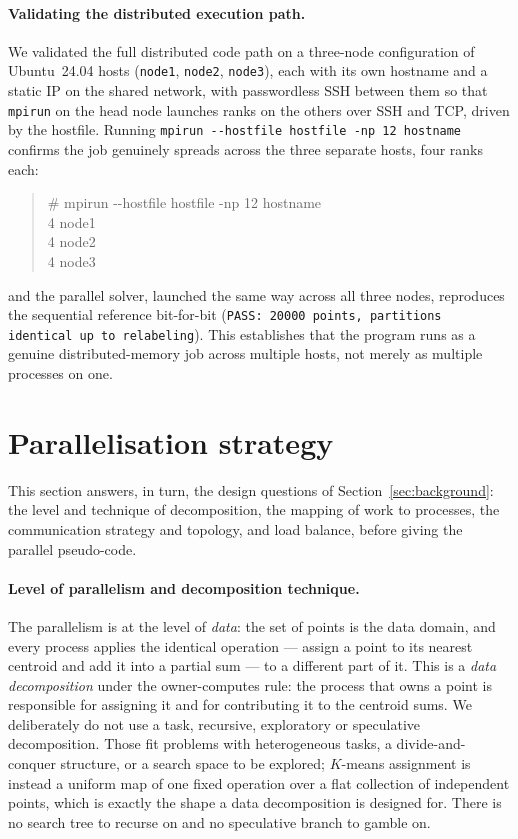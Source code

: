 \documentclass[11pt,a4paper]{article}
\begin{document}
\paragraph{Validating the distributed execution path.}
We validated the full distributed code path on a three-node configuration of
Ubuntu~24.04 hosts (\texttt{node1}, \texttt{node2}, \texttt{node3}), each with
its own hostname and a static IP on the shared network, with passwordless SSH
between them so that \texttt{mpirun} on the head node launches ranks on the
others over SSH and TCP, driven by the hostfile. Running
\texttt{mpirun -{}-hostfile hostfile -np 12 hostname} confirms the job genuinely
spreads across the three separate hosts, four ranks each:
\begin{quote}\small\ttfamily
\# mpirun -{}-hostfile hostfile -np 12 hostname\\
\hspace*{2em}4 node1\\
\hspace*{2em}4 node2\\
\hspace*{2em}4 node3
\end{quote}
and the parallel solver, launched the same way across all three nodes,
reproduces the sequential reference bit-for-bit (\texttt{PASS: 20000 points,
partitions identical up to relabeling}). This establishes that the program runs
as a genuine distributed-memory job across multiple hosts, not merely as
multiple processes on one.

\section{Parallelisation strategy}
\label{sec:parallel}

This section answers, in turn, the design questions of
Section~\ref{sec:background}: the level and technique of decomposition, the
mapping of work to processes, the communication strategy and topology, and load
balance, before giving the parallel pseudo-code.

\paragraph{Level of parallelism and decomposition technique.}
The parallelism is at the level of \emph{data}: the set of points is the data
domain, and every process applies the identical operation --- assign a point to
its nearest centroid and add it into a partial sum --- to a different part of it.
This is a \emph{data decomposition} under the owner-computes rule: the process
that owns a point is responsible for assigning it and for contributing it to the
centroid sums. We deliberately do not use a task, recursive, exploratory or
speculative decomposition. Those fit problems with heterogeneous tasks, a
divide-and-conquer structure, or a search space to be explored; $K$-means
assignment is instead a uniform map of one fixed operation over a flat
collection of independent points, which is exactly the shape a data
decomposition is designed for. There is no search tree to recurse on and no
speculative branch to gamble on.
\end{document}
